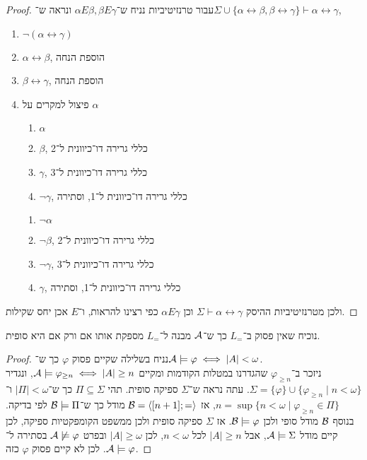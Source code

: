 \begin{proof}
	עבור טרנזיטיביות נניח ש־$\alpha E \beta, \beta E \gamma$ ונראה ש־$\Sigma \cup \{ \alpha \leftrightarrow \beta, \beta \leftrightarrow \gamma \} \vdash \alpha \leftrightarrow \gamma$,
	\begin{enumerate}
		\item $\lnot (\alpha \leftrightarrow \gamma)$
		\item $\alpha \leftrightarrow \beta$, הוספת הנחה
		\item $\beta \leftrightarrow \gamma$, הוספת הנחה
		\item פיצול למקרים על $\alpha$
			\begin{enumerate}
				\item $\alpha$
				\item $\beta$, כללי גרירה דו־כיוונית ל־2
				\item $\gamma$, כללי גרירה דו־כיוונית ל־3
				\item $\lnot \gamma$, כללי גרירה דו־כיוונית ל־1, וסתירה
			\end{enumerate}
			\begin{enumerate}
				\item $\lnot \alpha$
				\item $\lnot \beta$, כללי גרירה דו־כיוונית ל־2
				\item $\lnot \gamma$, כללי גרירה דו־כיוונית ל־3
				\item $\gamma$, כללי גרירה דו־כיוונית ל־1, וסתירה
			\end{enumerate}
	\end{enumerate}
	ולכן מטרנזיטיביות ההיסק $\Sigma \vdash \alpha \leftrightarrow \gamma$ וכן $\alpha E \gamma$ כפי רצינו להראות, ו־$E$ אכן יחס שקילות.
\end{proof}

\question{}
\subquestion{}
נוכיח שאין פסוק ב־$L_=$ כך ש־$\mathcal{A}$ מבנה ל־$L_=$ מספקת אותו אם ורק אם היא סופית.
\begin{proof}
	נניח בשלילה שקיים פסוק $\varphi$ כך ש־$\mathcal{A} \models \varphi \iff |A| < \omega$. \\
	ניזכר ב־$\varphi_{\ge n}$ שהגדרנו במטלות הקודמות ומקיים $\mathcal{A} \models \varphi_{\ge n} \iff |A| \ge n$,
	ונגדיר $\Sigma = \{ \varphi \} \cup \{ \varphi_{\ge n} \mid n < \omega \}$.
	עתה נראה ש־$\Sigma$ ספיקה סופית. תהי $\Pi \subseteq \Sigma$ כך ש־$|\Pi| < \omega$ ו־$n = \sup \{ n < \omega \mid \varphi_{\ge n} \in \Pi \}$, אז $\mathcal{B} = \langle [n + 1]; = \rangle$ מודל כך ש־$\mathcal{B} \models \Pi$ לפי בדיקה.
	בנוסף $\mathcal{B}$ מודל סופי ולכן $\mathcal{B} \models \varphi$.
	אז $\Sigma$ ספיקה סופית ולכן ממשפט הקומפקטיות ספיקה, לכן קיים מודל $\mathcal{A} \models \Sigma$, אבל $|A| \ge n$ לכל $n < \omega$, לכן $|A| \ge \omega$ ובפרט $\mathcal{A} \not\models \varphi$ בסתירה ל־$\mathcal{A} \models \varphi$.
	לכן לא קיים פסוק $\varphi$ כזה.
\end{proof}

